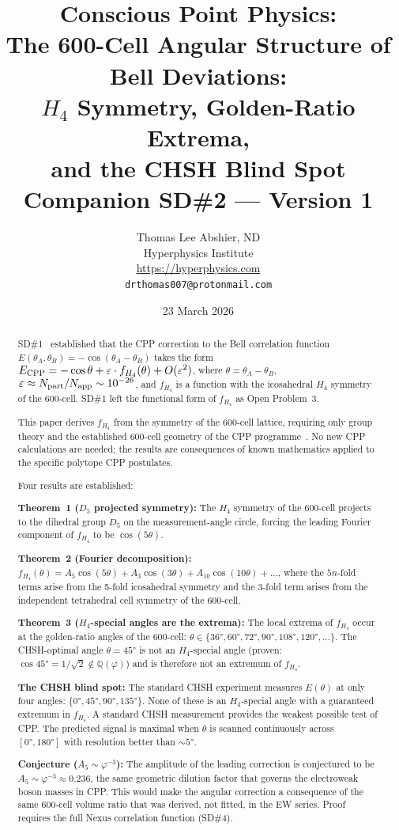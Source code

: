 \documentclass[11pt,a4paper]{article}
\title{\textbf{Conscious Point Physics:\\
The 600-Cell Angular Structure of Bell Deviations:\\
$H_4$ Symmetry, Golden-Ratio Extrema,\\
and the CHSH Blind Spot}\\[6pt]
{\large Companion SD\#2 --- Version 1}}
\author{Thomas Lee Abshier, ND\\
Hyperphysics Institute\\
\url{https://hyperphysics.com}\\
\texttt{drthomas007@protonmail.com}}
\date{23 March 2026}
\newcommand{\phig}{\varphi}
\newcommand{\eps}{\varepsilon}
\begin{document}
\maketitle

\begin{abstract}
SD\#1~\citep{cpp_sd1} established that the CPP correction to the
Bell correlation function $E(\theta_A,\theta_B) = -\cos(\theta_A -
\theta_B)$ takes the form
$E_{\rm CPP} = -\cos\theta + \eps\cdot f_{H_4}(\theta) + O(\eps^2)$,
where $\theta = \theta_A - \theta_B$, $\eps \approx
N_{\rm part}/N_{\rm app} \sim 10^{-26}$, and $f_{H_4}$ is a function
with the icosahedral $H_4$ symmetry of the 600-cell.  SD\#1 left the
functional form of $f_{H_4}$ as Open Problem~3.

This paper derives $f_{H_4}$ from the symmetry of the 600-cell
lattice, requiring only group theory and the established 600-cell
geometry of the CPP programme~\citep{cpp_ew_unified}.  No new CPP
calculations are needed; the results are consequences of known
mathematics applied to the specific polytope CPP postulates.

Four results are established:

\textbf{Theorem~1 ($D_5$ projected symmetry):} The $H_4$ symmetry of
the 600-cell projects to the dihedral group $D_5$ on the
measurement-angle circle, forcing the leading Fourier component of
$f_{H_4}$ to be $\cos(5\theta)$.

\textbf{Theorem~2 (Fourier decomposition):}
$f_{H_4}(\theta) = A_5\cos(5\theta) + A_3\cos(3\theta) +
A_{10}\cos(10\theta) + \ldots$, where the $5n$-fold terms arise from
the 5-fold icosahedral symmetry and the 3-fold term arises from the
independent tetrahedral cell symmetry of the 600-cell.

\textbf{Theorem~3 ($H_4$-special angles are the extrema):} The local
extrema of $f_{H_4}$ occur at the golden-ratio angles of the 600-cell:
$\theta \in \{36°, 60°, 72°, 90°, 108°, 120°, \ldots\}$.
The CHSH-optimal angle $\theta = 45°$ is not an $H_4$-special angle
(proven: $\cos 45° = 1/\sqrt{2} \notin \mathbb{Q}(\phig)$) and is
therefore not an extremum of $f_{H_4}$.

\textbf{The CHSH blind spot:} The standard CHSH experiment measures
$E(\theta)$ at only four angles: $\{0°, 45°, 90°, 135°\}$.  None of
these is an $H_4$-special angle with a guaranteed extremum in
$f_{H_4}$.  A standard CHSH measurement provides the weakest possible
test of CPP.  The predicted signal is maximal when $\theta$ is scanned
continuously across $[0°, 180°]$ with resolution better than $\sim 5°$.

\textbf{Conjecture ($A_5 \sim \phig^{-3}$):} The amplitude of the
leading correction is conjectured to be $A_5 \sim \phig^{-3} \approx
0.236$, the same geometric dilution factor that governs the electroweak
boson masses in CPP.  This would make the angular correction a
consequence of the same 600-cell volume ratio that was derived, not
fitted, in the EW series.  Proof requires the full Nexus correlation
function (SD\#4).
\end{abstract}
\end{document}
